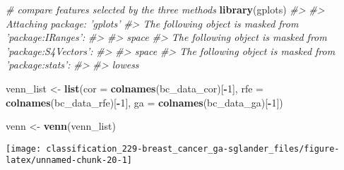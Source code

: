 \documentclass[]{book}
\newenvironment{Shaded}{\begin{snugshade}}{\end{snugshade}}
\newcommand{\CommentTok}[1]{\textcolor[rgb]{0.56,0.35,0.01}{\textit{#1}}}
\newcommand{\DataTypeTok}[1]{\textcolor[rgb]{0.13,0.29,0.53}{#1}}
\newcommand{\DecValTok}[1]{\textcolor[rgb]{0.00,0.00,0.81}{#1}}
\newcommand{\KeywordTok}[1]{\textcolor[rgb]{0.13,0.29,0.53}{\textbf{#1}}}
\newcommand{\NormalTok}[1]{#1}
\newcommand{\OperatorTok}[1]{\textcolor[rgb]{0.81,0.36,0.00}{\textbf{#1}}}
\newcommand{\StringTok}[1]{\textcolor[rgb]{0.31,0.60,0.02}{#1}}
\begin{document}
\begin{Shaded}
\begin{Highlighting}[]
\CommentTok{# compare features selected by the three methods}
\KeywordTok{library}\NormalTok{(gplots)}
\CommentTok{#> }
\CommentTok{#> Attaching package: 'gplots'}
\CommentTok{#> The following object is masked from 'package:IRanges':}
\CommentTok{#> }
\CommentTok{#>     space}
\CommentTok{#> The following object is masked from 'package:S4Vectors':}
\CommentTok{#> }
\CommentTok{#>     space}
\CommentTok{#> The following object is masked from 'package:stats':}
\CommentTok{#> }
\CommentTok{#>     lowess}

\NormalTok{venn_list <-}\StringTok{ }\KeywordTok{list}\NormalTok{(}\DataTypeTok{cor =} \KeywordTok{colnames}\NormalTok{(bc_data_cor)[}\OperatorTok{-}\DecValTok{1}\NormalTok{],}
                  \DataTypeTok{rfe =} \KeywordTok{colnames}\NormalTok{(bc_data_rfe)[}\OperatorTok{-}\DecValTok{1}\NormalTok{],}
                  \DataTypeTok{ga  =} \KeywordTok{colnames}\NormalTok{(bc_data_ga)[}\OperatorTok{-}\DecValTok{1}\NormalTok{])}

\NormalTok{venn <-}\StringTok{ }\KeywordTok{venn}\NormalTok{(venn_list)}
\end{Highlighting}
\end{Shaded}

\begin{center}\texttt{[image: classification\_229-breast\_cancer\_ga-sglander\_files/figure-latex/unnamed-chunk-20-1]} \end{center}

\begin{Shaded}
\end{Shaded}
\end{document}
